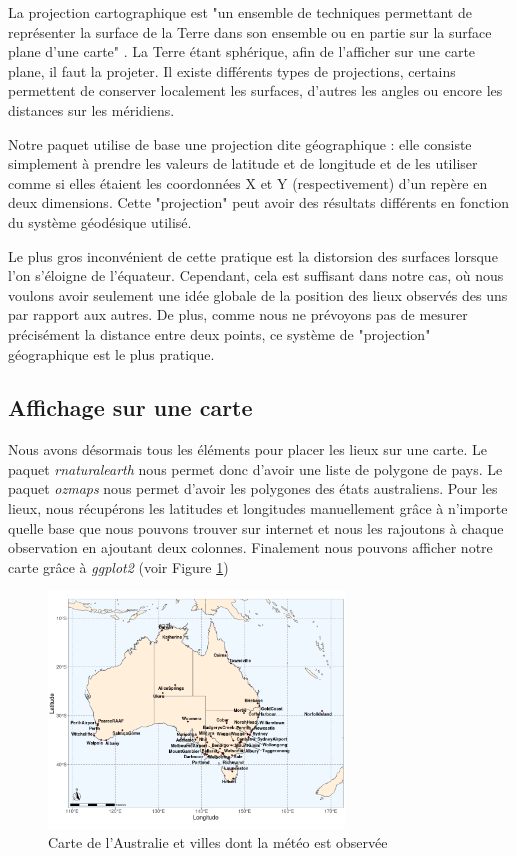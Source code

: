 \documentclass{article}
\begin{document}
La projection cartographique est "un ensemble de techniques permettant de représenter la surface de la Terre dans son ensemble ou en partie sur la surface plane d'une carte" \cite{frwiki:181713838}. La Terre étant sphérique, afin de l'afficher sur une carte plane, il faut la projeter. Il existe différents types de projections, certains permettent de conserver localement les surfaces, d'autres les angles ou encore les distances sur les méridiens. 

Notre paquet utilise de base une projection dite géographique : elle consiste simplement à prendre les valeurs de latitude et de longitude et de les utiliser comme si elles étaient les coordonnées X et Y (respectivement) d'un repère en deux dimensions. Cette "projection" peut avoir des résultats différents en fonction du système géodésique utilisé. 

Le plus gros inconvénient de cette pratique est la distorsion des surfaces lorsque l'on s'éloigne de l'équateur. Cependant, cela est suffisant dans notre cas, où nous voulons avoir seulement une idée globale de la position des lieux observés des uns par rapport aux autres. De plus, comme nous ne prévoyons pas de mesurer précisément la distance entre deux points, ce système de "projection" géographique est le plus pratique.

\subsection{Affichage sur une carte}

Nous avons désormais tous les éléments pour placer les lieux sur une carte. Le paquet \emph{rnaturalearth} nous permet donc d'avoir une liste de polygone de pays. Le paquet \emph{ozmaps} nous permet d'avoir les polygones des états australiens. Pour les lieux, nous récupérons les latitudes et longitudes manuellement grâce à n'importe quelle base que nous pouvons trouver sur internet et nous les rajoutons à chaque observation en ajoutant deux colonnes. Finalement nous pouvons afficher notre carte grâce à \emph{ggplot2} (voir Figure \ref{fig:carte_australie}) 

\begin{figure}[htp]
    \centering
    \includegraphics[width=0.7\textwidth]{Images/Cartographie/Australia_full_map.png}
    \caption{Carte de l'Australie et villes dont la météo est observée}
    \label{fig:carte_australie}
\end{figure}
\end{document}
